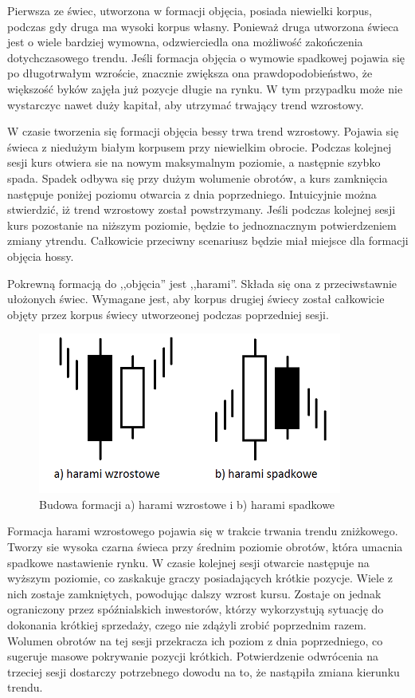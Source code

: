 \documentclass[pdflatex,11pt]{aghdpl}
\begin{document}
Pierwsza ze świec, utworzona w formacji objęcia, posiada niewielki korpus, podczas gdy druga ma wysoki korpus własny. Ponieważ druga utworzona świeca jest o wiele bardziej wymowna, odzwierciedla ona możliwość zakończenia dotychczasowego trendu. Jeśli formacja objęcia o wymowie spadkowej pojawia się po długotrwałym wzroście, znacznie zwiększa ona prawdopodobieństwo, że większość byków zajęła już pozycje długie na rynku. W tym przypadku może nie wystarczyc nawet duży kapitał, aby utrzymać trwający trend wzrostowy.

W czasie tworzenia się formacji objęcia bessy trwa trend wzrostowy. Pojawia się świeca z niedużym białym korpusem przy niewielkim obrocie. Podczas kolejnej sesji kurs otwiera sie na nowym maksymalnym poziomie, a następnie szybko spada. Spadek odbywa się przy dużym wolumenie obrotów, a kurs zamknięcia następuje poniżej poziomu otwarcia z dnia poprzedniego. Intuicyjnie można stwierdzić, iż trend wzrostowy został powstrzymany. Jeśli podczas kolejnej sesji kurs pozostanie na niższym poziomie, będzie to jednoznacznym potwierdzeniem zmiany ytrendu. Całkowicie przeciwny scenariusz będzie miał miejsce dla formacji objęcia hossy.

Pokrewną formacją do ,,objęcia'' jest ,,harami''. Składa się ona z przeciwstawnie ułożonych świec. Wymagane jest, aby korpus drugiej świecy został całkowicie objęty przez korpus świecy utworzeonej podczas poprzedniej sesji. 
\begin{figure}[ht]
\begin{center}
\includegraphics[width=10cm]{harami.png}
\caption{Budowa formacji a) harami wzrostowe i b) harami spadkowe}
\label{harami}
\end{center}
\end{figure} 

Formacja harami wzrostowego pojawia się w trakcie trwania trendu zniżkowego. Tworzy sie wysoka czarna świeca przy średnim poziomie obrotów, która umacnia spadkowe nastawienie rynku. W czasie kolejnej sesji otwarcie następuje na wyższym poziomie, co zaskakuje graczy posiadających krótkie pozycje. Wiele z nich zostaje zamkniętych, powodując dalszy wzrost kursu. Zostaje on jednak ograniczony przez spóźnialskich inwestorów, którzy wykorzystują sytuację do dokonania krótkiej sprzedaży, czego nie zdążyli zrobić poprzednim razem. Wolumen obrotów na tej sesji przekracza ich poziom z dnia poprzedniego, co sugeruje masowe pokrywanie pozycji krótkich. Potwierdzenie odwrócenia na trzeciej sesji dostarczy potrzebnego dowodu na to, że nastąpiła zmiana kierunku trendu.
\end{document}
